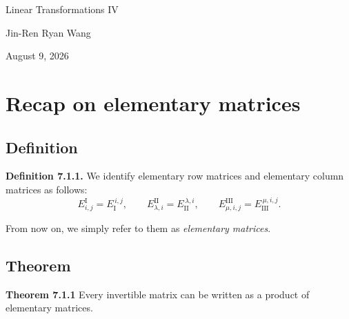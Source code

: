 \documentclass[12pt]{article}
\begin{document}
\begin{titlepage}
    \centering

    \vspace*{\fill}

    {\Huge Linear Transformations IV}

    \vspace{1cm}

    {\Large Jin-Ren Ryan Wang\par}

    \vspace{0.5cm}

    {\large August 9, 2026\par}

    \vspace*{\fill}
\end{titlepage}

\tableofcontents

\newpage

\section{Recap on elementary matrices}

\subsection{Definition}

\textbf{Definition 7.1.1.}
We identify elementary row matrices and elementary column matrices as follows:
\[
E_{i,j}^{\mathrm{I}}
    = E_{\mathrm{I}}^{\,i,j}, \qquad
E_{\lambda,i}^{\mathrm{II}}
    = E_{\mathrm{II}}^{\,\lambda,i}, \qquad
E_{\mu,i,j}^{\mathrm{III}}
    = E_{\mathrm{III}}^{\,\mu,i,j}.
\]

From now on, we simply refer to them as \emph{elementary matrices}.

\subsection{Theorem}

\textbf{Theorem 7.1.1}
Every invertible matrix can be written as a product of elementary matrices.
\end{document}

